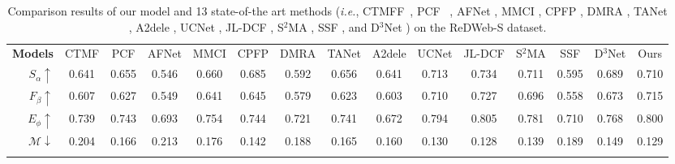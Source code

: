 \documentclass[10pt,twocolumn,letterpaper]{article}
\def\ie{\emph{i.e.}}
\newlength\savedwidth
\newcommand{\whline}[1]{\noalign{\global\savedwidth\arrayrulewidth \global\arrayrulewidth #1}\hline \noalign{\global\arrayrulewidth\savedwidth}}
\begin{document}
\begin{table*}[t!]
  \centering
  \renewcommand{\arraystretch}{1.2}
  \renewcommand{\tabcolsep}{1.99mm}
  \caption{Comparison results of our model and 13 state-of-the art methods (\ie, CTMFF~\cite{han2017cnns}, PCF~ \cite{chen2018progressively}, AFNet \cite{wang2019adaptive}, MMCI \cite{chen2019multi}, CPFP \cite{zhao2019contrast}, DMRA \cite{piao2019depth}, TANet \cite{chen2019three}, A2dele \cite{piao2020}, UCNet \cite{zhang2020uc}, JL-DCF \cite{fu2020jl}, S$^2$MA \cite{liu2020}, SSF \cite{zhang2020}, and D$^3$Net \cite{fan2019rethinking}) on the ReDWeb-S dataset.} \scriptsize
  \begin{tabular}{r|c|c|c|c|c|c|c|c|c|c|c|c|c|c}
  \whline{1pt}


    \textbf{Models}
    & CTMF & PCF & AFNet   & MMCI  & CPFP   & DMRA & TANet   & A2dele   & UCNet   & JL-DCF & S$^2$MA   & SSF  & D$^3$Net & Ours\\

    \whline{1pt}

    $S_{\alpha}\uparrow$
    & 0.641    & 0.655    & 0.546  & 0.660      & 0.685    & 0.592  & 0.656 & 0.641    & 0.713  & 0.734   & 0.711 &0.595 & 0.689 & 0.710\\

    $F_{\beta}\uparrow$
    & 0.607    & 0.627    & 0.549  & 0.641      & 0.645    & 0.579  & 0.623 & 0.603    & 0.710  & 0.727   & 0.696 &0.558 & 0.673 & 0.715\\

    $E_{\phi}\uparrow$
    & 0.739    & 0.743    & 0.693  & 0.754      & 0.744    & 0.721  & 0.741 & 0.672    & 0.794  & 0.805   & 0.781 &0.710 & 0.768 & 0.800\\

    $\mathcal{M}\downarrow$
    & 0.204    & 0.166    & 0.213  & 0.176      & 0.142    & 0.188  & 0.165 & 0.160    & 0.130  & 0.128   & 0.139 &0.189 & 0.149 & 0.129\\



\whline{1pt}

  \end{tabular}\label{tab2}
\end{table*}
\end{document}
